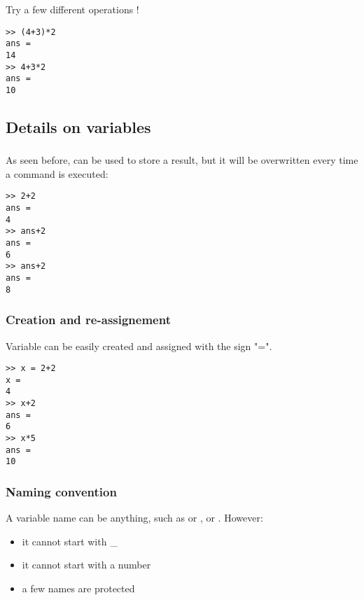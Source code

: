 		Try a few different operations !
\begin{lstlisting}
>> (4+3)*2
ans =
14
>> 4+3*2
ans =
10
\end{lstlisting}

	\subsection{Details on variables}
		\subsubsection{}
			As seen before,  can be used to store a result, but it will be overwritten every time a command is executed:
\begin{lstlisting}
>> 2+2
ans =
4
>> ans+2
ans =
6
>> ans+2
ans =
8
\end{lstlisting}

		\subsubsection{Creation and re-assignement}
			Variable can be easily created and assigned with the sign "=". 
\begin{lstlisting}
>> x = 2+2
x =
4
>> x+2
ans =
6
>> x*5
ans =
10
\end{lstlisting}

		\subsubsection{Naming convention}
			A variable name can be anything, such as  or  , or  .
			However:
			\begin{itemize}
				\item it cannot start with \_
				\item it cannot start with a number
				\item a few names are protected
			\end{itemize}

